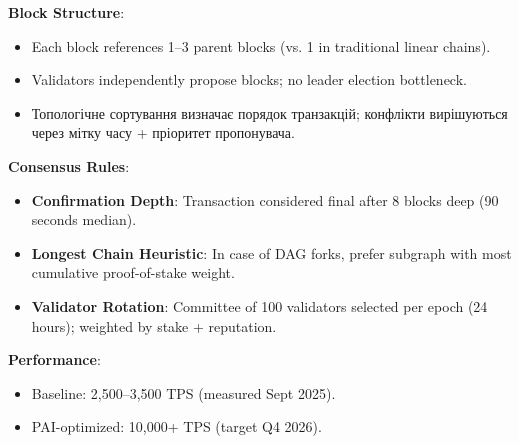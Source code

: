 \documentclass[11pt]{article}
\begin{document}
\textbf{Block Structure}:
\begin{itemize}[noitemsep]
  \item Each block references 1--3 parent blocks (vs. 1 in traditional linear chains).
  \item Validators independently propose blocks; no leader election bottleneck.
  \item Топологічне сортування визначає порядок транзакцій; конфлікти вирішуються через мітку часу + пріоритет пропонувача.
\end{itemize}

\textbf{Consensus Rules}:
\begin{itemize}[noitemsep]
  \item \textbf{Confirmation Depth}: Transaction considered final after 8 blocks deep (90 seconds median).
  \item \textbf{Longest Chain Heuristic}: In case of DAG forks, prefer subgraph with most cumulative proof-of-stake weight.
  \item \textbf{Validator Rotation}: Committee of 100 validators selected per epoch (24 hours); weighted by stake + reputation.
\end{itemize}

\textbf{Performance}:
\begin{itemize}[noitemsep]
  \item Baseline: 2,500--3,500 TPS (measured Sept 2025).
  \item PAI-optimized: 10,000+ TPS (target Q4 2026).
\end{itemize}
\end{document}
